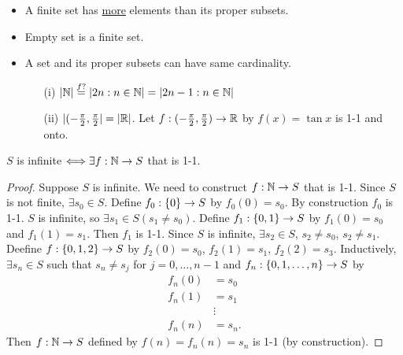 \documentclass[]{article}
\begin{document}
\begin{note}
	\begin{itemize}
		\item A finite set has \ul{more} elements than its proper subsets.
		\item Empty set is a finite set.
		\item A set and its proper subsets can have same cardinality.
		\begin{example}
			\begin{itemize}
				\item[(i)] $|\mathbb{N}|\overset{f?}{=} |2n:n\in\mathbb{N}| = |2n-1:n\in\mathbb{N}|$
				\item[(ii)] $|(-\frac{\pi}{2},\frac{\pi}{2}| = |\mathbb{R}|$. Let $f:(-\frac{\pi}{2},\frac{\pi}{2}) \rightarrow \mathbb{R}$ by $f(x) = \tan x$ is 1-1 and onto.
			\end{itemize}
		\end{example}
	\end{itemize}
\end{note}

\begin{proposition}
	$S$ is infinite $\Longleftrightarrow \exists f:\mathbb{N} \rightarrow S$ that is 1-1.
\end{proposition}
\begin{proof}
	\say{$\implies$} Suppose $S$ is infinite. We need to construct $f:\mathbb{N}\rightarrow S$ that is 1-1. Since $S$ is not finite, $\exists s_0\in S$.
	Define $f_0:\{0\}\rightarrow S$ by $f_0(0) = s_0$. By construction $f_0$ is 1-1.
	$S$ is infinite, so $\exists s_1\in S (s_1\neq s_0)$.
	Define $f_1:\{0,1\} \rightarrow S$ by $f_1(0) = s_0$ and $f_1(1) = s_1$.
	Then $f_1$ is 1-1. Since $S$ is infinite, $\exists s_2\in S$, $s_2\neq s_0$, $s_2\neq s_1$. Deefine $f:\{0,1,2\} \rightarrow S$ by $f_2(0) = s_0$, $f_2(1) = s_1$, $f_2(2) = s_3$.
	Inductively, $\exists s_n\in S$ such that $s_n\neq s_j$ for $j=0,\dots,n-1$ and $f_n : \{0,1,\dots,n\}\rightarrow S$ by
	\begin{align*}
		f_n(0) &= s_0 \\
		f_n(1) &= s_1 \\
		       &\vdots \\
		f_n(n) &= s_n.
	\end{align*}
	Then $f:\mathbb{N}\rightarrow S$ defined by $f(n) = f_n(n) = s_n$ is 1-1 (by construction).
\end{proof}
\end{document}
